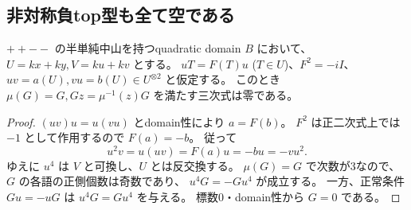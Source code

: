 \subsection{非対称負top型も全て空である}
\begin{lemma}[負生成元の四乗による正常三次の消滅]
\label{lem:h3-order2-22-fourth-power-obstruction}
$++--$ の半単純中山を持つquadratic domain $B$ において、$U=kx+ky,V=ku+kv$ とする。
$uT=F(T)u$ ($T\in U$)、$F^2=-iI$、$uv=a(U),vu=b(U)\in U^{\otimes2}$ と仮定する。
このとき $\mu(G)=G,Gz=\mu^{-1}(z)G$ を満たす三次式は零である。
\end{lemma}
\begin{proof}
$(uv)u=u(vu)$ とdomain性により $a=F(b)$。
$F^2$ は正二次式上では $-1$ として作用するので $F(a)=-b$。
従って
\[
 u^2v=u(uv)=F(a)u=-bu=-vu^2.
\]
ゆえに $u^4$ は $V$ と可換し、$U$ とは反交換する。
$\mu(G)=G$ で次数が3なので、$G$ の各語の正側個数は奇数であり、
$u^4G=-Gu^4$ が成立する。
一方、正常条件 $Gu=-uG$ は $u^4G=Gu^4$ を与える。
標数0・domain性から $G=0$ である。
\end{proof}

